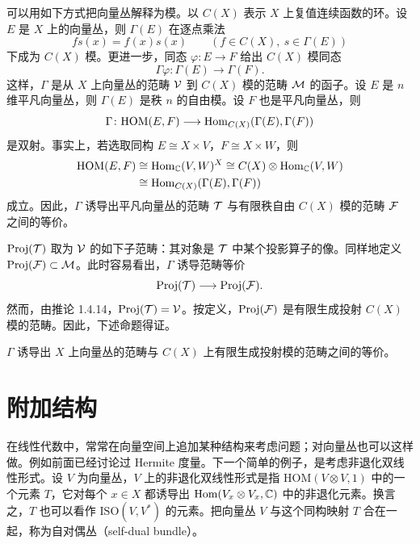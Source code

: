 \begin{remark}{}
  可以用如下方式把向量丛解释为模。以 $C(X)$ 表示 $X$ 上复值连续函数的环。设 $E$ 是 $X$ 上的向量丛，则 $\Gamma(E)$ 在逐点乘法
  \[
  fs(x)=f(x)s(x)\qquad(f\in C(X),\ s\in\Gamma(E))
  \]
  下成为 $C(X)$ 模。更进一步，同态 $\varphi\colon E\to F$ 给出 $C(X)$ 模同态
  \[
  \Gamma\varphi\colon\Gamma(E)\longrightarrow\Gamma(F).
  \]
  这样，$\Gamma$ 是从 $X$ 上向量丛的范畴 $\mathcal{V}$ 到 $C(X)$ 模的范畴 $\mathcal{M}$ 的函子。设 $E$ 是 $n$ 维平凡向量丛，则 $\Gamma(E)$ 是秩 $n$ 的自由模。设 $F$ 也是平凡向量丛，则
  \[
  \Gamma\colon\mathrm{HOM}(E,F)\longrightarrow\operatorname{Hom}_{C(X)}(\Gamma(E),\Gamma(F))
  \]
  是双射。事实上，若选取同构 $E\cong X\times V$，$F\cong X\times W$，则
  \begin{align*}
  \mathrm{HOM}(E,F)&\cong\operatorname{Hom}_{\mathbb{C}}(V,W)^{X}\cong C(X)\otimes\operatorname{Hom}_{\mathbb{C}}(V,W)\\
  &\cong\operatorname{Hom}_{C(X)}(\Gamma(E),\Gamma(F))
  \end{align*}
  成立。因此，$\Gamma$ 诱导出平凡向量丛的范畴 $\mathcal{T}$ 与有限秩自由 $C(X)$ 模的范畴 $\mathcal{F}$ 之间的等价。

  $\mathrm{Proj}(\mathcal{T})$ 取为 $\mathcal{V}$ 的如下子范畴：其对象是 $\mathcal{T}$ 中某个投影算子的像。同样地定义 $\mathrm{Proj}(\mathcal{F})\subset\mathcal{M}$。此时容易看出，$\Gamma$ 诱导范畴等价
  \[
  \mathrm{Proj}(\mathcal{T})\longrightarrow\mathrm{Proj}(\mathcal{F}).
  \]
  然而，由推论 1.4.14，$\mathrm{Proj}(\mathcal{T})=\mathcal{V}$。按定义，$\mathrm{Proj}(\mathcal{F})$ 是有限生成投射 $C(X)$ 模的范畴。因此，下述命题得证。
\end{remark}

\begin{proposition*}{}
  $\Gamma$ 诱导出 $X$ 上向量丛的范畴与 $C(X)$ 上有限生成投射模的范畴之间的等价。
\end{proposition*}

\section{附加结构}

在线性代数中，常常在向量空间上追加某种结构来考虑问题；对向量丛也可以这样做。例如前面已经讨论过 Hermite 度量。下一个简单的例子，是考虑非退化双线性形式。设 $V$ 为向量丛，$V$ 上的非退化双线性形式是指 $\mathrm{HOM}(V\otimes V,1)$ 中的一个元素 $T$，它对每个 $x\in X$ 都诱导出 $\operatorname{Hom}(V_x\otimes V_x,\mathbb{C})$ 中的非退化元素。换言之，$T$ 也可以看作 $\mathrm{ISO}(V,V^{*})$ 的元素。把向量丛 $V$ 与这个同构映射 $T$ 合在一起，称为自对偶丛（self-dual bundle）。

